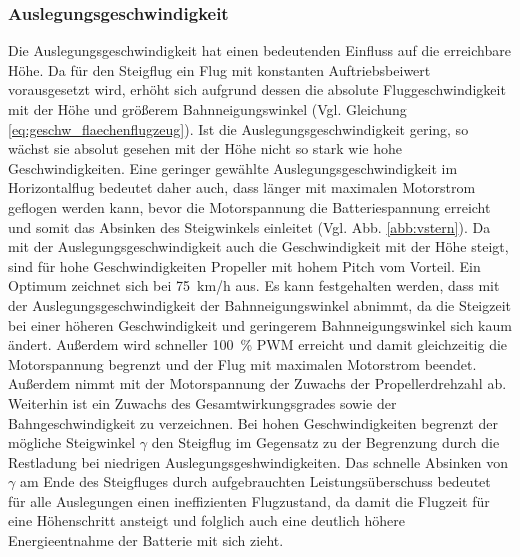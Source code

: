 \subsubsection{Auslegungsgeschwindigkeit}
Die Auslegungsgeschwindigkeit hat einen bedeutenden Einfluss auf die erreichbare Höhe. Da für den Steigflug ein Flug mit konstanten Auftriebsbeiwert vorausgesetzt wird, erhöht sich aufgrund dessen die absolute Fluggeschwindigkeit mit der Höhe und größerem Bahnneigungswinkel (Vgl. Gleichung \ref{eq:geschw_flaechenflugzeug}).
Ist die Auslegungsgeschwindigkeit gering, so wächst sie absolut gesehen mit der Höhe nicht so stark wie hohe Geschwindigkeiten. Eine geringer gewählte Auslegungsgeschwindigkeit im Horizontalflug bedeutet daher auch, dass länger mit maximalen Motorstrom geflogen werden kann, bevor die Motorspannung die Batteriespannung erreicht und somit das Absinken des Steigwinkels einleitet (Vgl. Abb. \ref{abb:vstern}).
Da mit der Auslegungsgeschwindigkeit auch die Geschwindigkeit mit der Höhe steigt, sind für hohe Geschwindigkeiten Propeller mit hohem Pitch vom Vorteil.
Ein Optimum zeichnet sich bei \SI{75}{km/h} aus. Es kann festgehalten werden, dass mit der Auslegungsgeschwindigkeit der Bahnneigungswinkel abnimmt, da die Steigzeit bei einer höheren Geschwindigkeit und geringerem Bahnneigungswinkel sich kaum ändert. Außerdem wird schneller \SI{100}{\%} PWM erreicht und damit gleichzeitig die Motorspannung begrenzt und der Flug mit maximalen Motorstrom beendet. Außerdem nimmt mit der Motorspannung der Zuwachs der Propellerdrehzahl ab. Weiterhin ist ein Zuwachs des Gesamtwirkungsgrades sowie der Bahngeschwindigkeit zu verzeichnen. Bei hohen Geschwindigkeiten begrenzt der mögliche Steigwinkel \ensuremath{\gamma} den Steigflug im Gegensatz zu der Begrenzung durch die Restladung bei niedrigen Auslegungsgeshwindigkeiten. Das schnelle Absinken von \ensuremath{\gamma} am Ende des Steigfluges durch aufgebrauchten Leistungsüberschuss bedeutet für alle Auslegungen einen ineffizienten Flugzustand, da damit die Flugzeit für eine Höhenschritt ansteigt und folglich auch eine deutlich höhere Energieentnahme der Batterie mit sich zieht.

